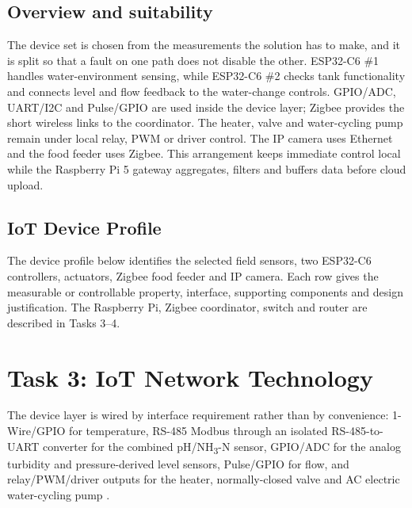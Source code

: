 \documentclass[lang=en,11pt,a4paper,citestyle=apa,bibstyle=apa]{elegantpaper}
\begin{document}
\subsection{Overview and suitability}

The device set is chosen from the measurements the solution has to make, and it is split so that a fault on one path does not disable the other. ESP32-C6 \#1 handles water-environment sensing, while ESP32-C6 \#2 checks tank functionality and connects level and flow feedback to the water-change controls. GPIO/ADC, UART/I2C and Pulse/GPIO are used inside the device layer; Zigbee provides the short wireless links to the coordinator. The heater, valve and water-cycling pump remain under local relay, PWM or driver control. The IP camera uses Ethernet and the food feeder uses Zigbee. This arrangement keeps immediate control local while the Raspberry Pi 5 gateway aggregates, filters and buffers data before cloud upload.

\subsection{IoT Device Profile}

The device profile below identifies the selected field sensors, two ESP32-C6 controllers, actuators, Zigbee food feeder and IP camera. Each row gives the measurable or controllable property, interface, supporting components and design justification. The Raspberry Pi, Zigbee coordinator, switch and router are described in Tasks 3--4.

\begingroup
\scriptsize
\setlength{\tabcolsep}{1pt}
\setlength{\LTleft}{0pt}
\setlength{\LTright}{0pt}
\setlength{\LTcapwidth}{\textwidth}
\setlength{\LTpre}{0pt}
\setlength{\LTpost}{0pt}

\endgroup

\section{Task 3: IoT Network Technology}

The device layer is wired by interface requirement rather than by convenience: 1-Wire/GPIO for temperature, RS-485 Modbus through an isolated RS-485-to-UART converter for the combined pH/NH\textsubscript{3}-N sensor, GPIO/ADC for the analog turbidity and pressure-derived level sensors, Pulse/GPIO for flow, and relay/PWM/driver outputs for the heater, normally-closed valve and AC electric water-cycling pump \parencite{EspressifESP32C6DevKitC1,DFRobotDFR0845}.
\end{document}
